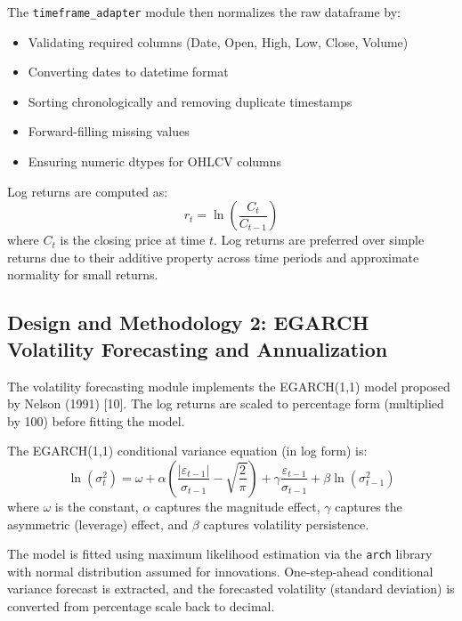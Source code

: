 \documentclass[12pt,a4paper]{article}
\begin{document}
The \texttt{timeframe\_adapter} module then normalizes the raw dataframe by:

\begin{itemize}
    \item Validating required columns (Date, Open, High, Low, Close, Volume)
    \item Converting dates to datetime format
    \item Sorting chronologically and removing duplicate timestamps
    \item Forward-filling missing values
    \item Ensuring numeric dtypes for OHLCV columns
\end{itemize}

Log returns are computed as:
\begin{equation}
    r_t = \ln\left(\frac{C_t}{C_{t-1}}\right)
\end{equation}
where $C_t$ is the closing price at time $t$. Log returns are preferred over simple returns due to their additive property across time periods and approximate normality for small returns.

\subsection{Design and Methodology 2: EGARCH Volatility Forecasting and Annualization}

The volatility forecasting module implements the EGARCH(1,1) model proposed by Nelson (1991) [10]. The log returns are scaled to percentage form (multiplied by 100) before fitting the model.

The EGARCH(1,1) conditional variance equation (in log form) is:
\begin{equation}
    \ln(\sigma_t^2) = \omega + \alpha \left(\frac{|\varepsilon_{t-1}|}{\sigma_{t-1}} - \sqrt{\frac{2}{\pi}}\right) + \gamma \frac{\varepsilon_{t-1}}{\sigma_{t-1}} + \beta \ln(\sigma_{t-1}^2)
\end{equation}
where $\omega$ is the constant, $\alpha$ captures the magnitude effect, $\gamma$ captures the asymmetric (leverage) effect, and $\beta$ captures volatility persistence.

The model is fitted using maximum likelihood estimation via the \texttt{arch} library with normal distribution assumed for innovations. One-step-ahead conditional variance forecast is extracted, and the forecasted volatility (standard deviation) is converted from percentage scale back to decimal.
\end{document}
